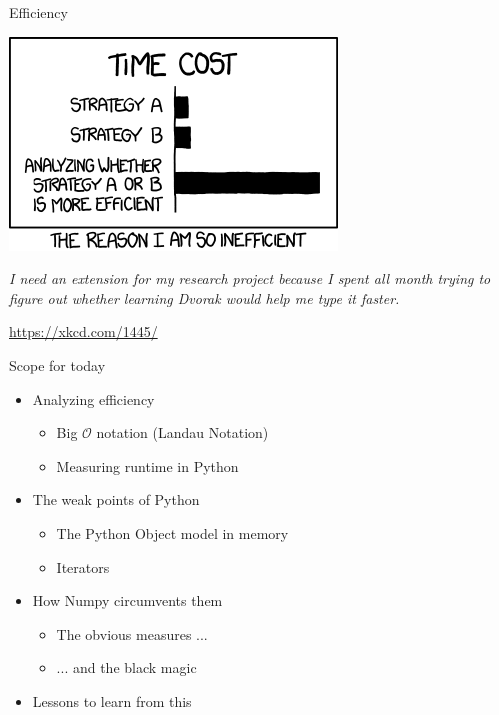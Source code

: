 
\begin{frame}[t,plain]
\titlepage
\end{frame}


\begin{frame}{Efficiency}
%
\begin{center}
	\includegraphics[width=.4\linewidth]{./gfx/02-xkcd-efficiency}\\
	\vspace{6pt}
	
	\scriptsize
	\emph{I need an extension for my research project because I spent all month trying to figure out whether learning Dvorak would help me type it faster.}

	\vspace{6pt}
	\url{https://xkcd.com/1445/}
\end{center}
%
\end{frame}


\begin{frame}{Scope for today}
%
\begin{itemize}
\item Analyzing efficiency
	\begin{itemize}
	\item Big $\mathcal{O}$ notation (Landau Notation)
	\item Measuring runtime in Python
	\end{itemize}
\item The weak points of Python
	\begin{itemize}
	\item The Python Object model in memory
	\item Iterators
	\end{itemize}
\item How Numpy circumvents them
	\begin{itemize}
	\item The obvious measures ...
	\item ... and the black magic
	\end{itemize}
\item Lessons to learn from this
\end{itemize}
%
\end{frame}

